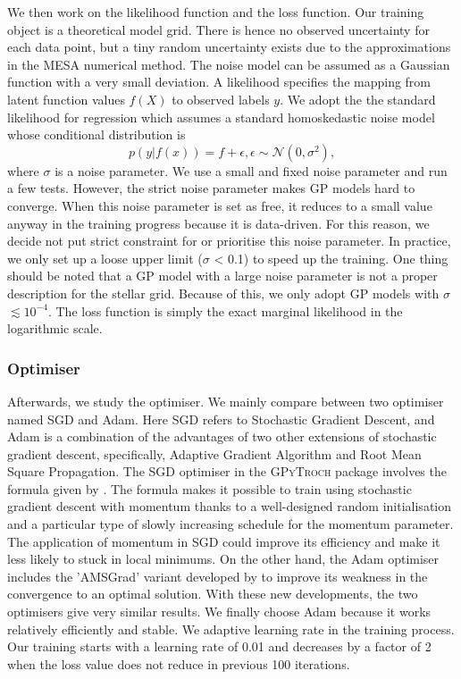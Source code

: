 We then work on the likelihood function and the loss function. Our training object is a theoretical model grid. There is hence no observed uncertainty for each data point, but a tiny random uncertainty exists due to the approximations in the \textsc{MESA} numerical method. The noise model can be assumed as a Gaussian function with a very small deviation. 
%   
A likelihood specifies the mapping from latent function values $f(X)$ to observed labels $y$.
We adopt the the standard likelihood for regression which assumes a standard homoskedastic noise model whose conditional distribution is
\begin{equation}\label{eq:likelihood}
p(y|f(x)) = f + \epsilon, \epsilon \sim \mathcal{N}(0, \sigma^{2}),
\end{equation}
where $\sigma$ is a noise parameter. 
%
We use a small and fixed noise parameter and run a few tests. However, the strict noise parameter makes GP models hard to converge. When this noise parameter is set as free, it reduces to a small value anyway in the training progress because it is data-driven. For this reason, we decide not put strict constraint for or prioritise this noise parameter. In practice, we only set up a loose upper limit ($\sigma$  < 0.1) to speed up the training. One thing should be noted that a GP model with a large noise parameter is not a proper description for the stellar grid. Because of this, we only adopt GP models with $\sigma$ $\lesssim 10^{-4}$.   
The loss function is simply the exact marginal likelihood in the logarithmic scale.

\subsubsection{Optimiser}

Afterwards, we study the optimiser. We mainly compare between two optimiser named SGD and Adam. Here SGD refers to Stochastic Gradient Descent, and Adam is a combination of the advantages of two other extensions of stochastic gradient descent, specifically, Adaptive Gradient Algorithm and Root Mean Square Propagation. 
%
The SGD optimiser in the \textsc{GPyTroch} package involves the formula given by \citet{sutskever2013importance}. The formula makes it possible to train using stochastic gradient descent with momentum thanks to a well-designed random initialisation and a particular type of slowly increasing schedule for the momentum parameter. The application of momentum in SGD could improve its efficiency and make it less likely to stuck in local minimums. On the other hand, the Adam optimiser includes the 'AMSGrad' variant developed by \citet{47409} to improve its weakness in the convergence to an optimal solution. With these new developments, the two optimisers give very similar results. We finally choose Adam because it works relatively efficiently and stable.  
%
We adaptive learning rate in the training process. Our training starts with a learning rate of 0.01 and decreases by a factor of 2 when the loss value does not reduce in previous 100 iterations.    

